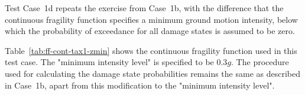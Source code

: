 Test Case~1d repeats the exercise from Case~1b, with the difference that the continuous fragility function specifies a minimum ground motion intensity, below which the probability of exceedance for all damage states is assumed to be zero.

Table~\ref{tab:ff-cont-tax1-zmin} shows the continuous fragility function used in this test case. The "minimum intensity level" is specified to be $0.3 g$. The procedure used for calculating the damage state probabilities remains the same as described in Case~1b, apart from this modification to the "minimum intensity level".